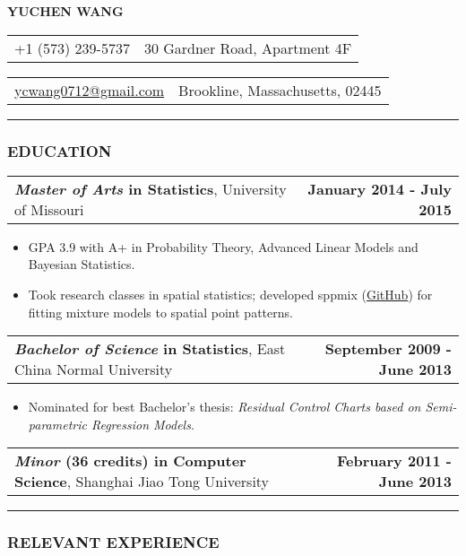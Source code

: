 \documentclass[11pt]{article}
\makeatletter
\newcommand{\headerrow}[2]
{\begin{tabular*}{\linewidth}{l@{\extracolsep{\fill}}r}
	#1 & #2 \\
\end{tabular*}
}
\makeatother
\begin{document}
\begin{center}
	\huge\textbf{YUCHEN WANG}
\end{center}
\noindent\headerrow{+1 (573) 239-5737}{30 Gardner Road, Apartment 4F}
\headerrow{\href{mailto:ycwang0712@gmail.com}{ycwang0712@gmail.com}}{Brookline, Massachusetts, 02445}

\vspace{-.8em}
\hrule

\subsubsection*{\centering EDUCATION}
\vspace{-.3em}

\headerrow
	{\textbf{\emph{Master of Arts} in Statistics}, University of Missouri}
	{\textbf{January 2014 - July 2015}}
	\begin{itemize}
		\item GPA 3.9 with A+ in Probability Theory, Advanced Linear Models and Bayesian Statistics.
		\item Took research classes in spatial statistics; developed sppmix (\href{https://github.com/wangyuchen/sppmix}{GitHub}) for fitting mixture models to spatial point patterns.
	\end{itemize}
\noindent\headerrow
	{\textbf{\emph{Bachelor of Science} in Statistics}, East China Normal University}
	{\textbf{September 2009 - June 2013}}
	\begin{itemize}
		\item Nominated for best Bachelor's thesis: \textit{Residual Control Charts based on Semi-parametric Regression Models}.
	\end{itemize}
\noindent\headerrow
	{\textbf{\emph{Minor} (36 credits) in Computer Science}, Shanghai Jiao Tong University}
	{\textbf{February 2011 - June 2013}}


\vspace{-.8em}
\hrule


\subsubsection*{\centering RELEVANT EXPERIENCE}
\vspace{-.3em}
\end{document}
